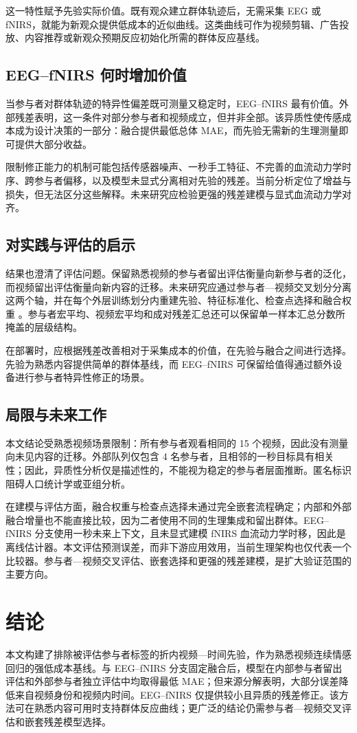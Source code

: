 这一特性赋予先验实际价值。既有观众建立群体轨迹后，无需采集 EEG 或 fNIRS，就能为新观众提供低成本的近似曲线。这类曲线可作为视频剪辑、广告投放、内容推荐或新观众预期反应初始化所需的群体反应基线。

\subsection{EEG--fNIRS 何时增加价值}

当参与者对群体轨迹的特异性偏差既可测量又稳定时，EEG--fNIRS 最有价值。外部残差表明，这一条件对部分参与者和视频成立，但并非全部。该异质性使传感成本成为设计决策的一部分：融合提供最低总体 MAE，而先验无需新的生理测量即可提供大部分收益。

限制修正能力的机制可能包括传感器噪声、一秒手工特征、不完善的血流动力学时序、跨参与者偏移，以及模型未显式分离相对先验的残差。当前分析定位了增益与损失，但无法区分这些解释。未来研究应检验更强的残差建模与显式血流动力学对齐。

\subsection{对实践与评估的启示}

结果也澄清了评估问题。保留熟悉视频的参与者留出评估衡量向新参与者的泛化，而视频留出评估衡量向新内容的迁移。未来研究应通过参与者—视频交叉划分分离这两个轴，并在每个外层训练划分内重建先验、特征标准化、检查点选择和融合权重
\cite{varma2006bias,varoquaux2017decoders}。参与者宏平均、视频宏平均和成对残差汇总还可以保留单一样本汇总分数所掩盖的层级结构。

在部署时，应根据残差改善相对于采集成本的价值，在先验与融合之间进行选择。先验为熟悉内容提供简单的群体基线，而 EEG--fNIRS 可保留给值得通过额外设备进行参与者特异性修正的场景。

\subsection{局限与未来工作}

本文结论受熟悉视频场景限制：所有参与者观看相同的 15 个视频，因此没有测量向未见内容的迁移。外部队列仅包含 4 名参与者，且相邻的一秒目标具有相关性；因此，异质性分析仅是描述性的，不能视为稳定的参与者层面推断。匿名标识阻碍人口统计学或亚组分析。

在建模与评估方面，融合权重与检查点选择未通过完全嵌套流程确定；内部和外部融合增量也不能直接比较，因为二者使用不同的生理集成和留出群体。EEG--fNIRS 分支使用一秒未来上下文，且未显式建模 fNIRS 血流动力学时移，因此是离线估计器。本文评估预测误差，而非下游应用效用，当前生理架构也仅代表一个比较器。参与者—视频交叉评估、嵌套选择和更强的残差建模，是扩大验证范围的主要方向。

\section{结论}
\label{sec:conclusion}

本文构建了排除被评估参与者标签的折内视频—时间先验，作为熟悉视频连续情感回归的强低成本基线。与 EEG--fNIRS 分支固定融合后，模型在内部参与者留出评估和外部参与者独立评估中均取得最低 MAE；但来源分解表明，大部分误差降低来自视频身份和视频内时间。EEG--fNIRS 仅提供较小且异质的残差修正。该方法可在熟悉内容可用时支持群体反应曲线；更广泛的结论仍需参与者—视频交叉评估和嵌套残差模型选择。
